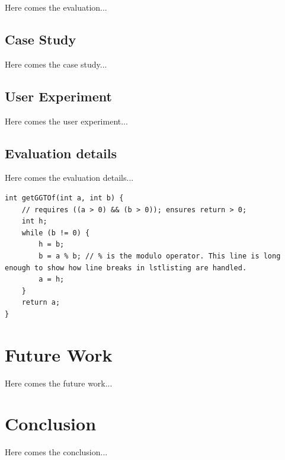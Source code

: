 \documentclass[
    fontsize=12pt,
    headings=small,
    parskip=half,           %
    bibliography=totoc,
    numbers=noenddot,       %
    open=any,               %
    ]{scrreprt}
\begin{document}
Here comes the evaluation...

\section{Case Study}

Here comes the case study...

\section{User Experiment}

Here comes the user experiment...

\section{Evaluation details}

Here comes the evaluation details...

\begin{lstlisting}[float,caption={Example of algorithm},label={lst:ggt}]
int getGGTOf(int a, int b) {
    // requires ((a > 0) && (b > 0)); ensures return > 0;
    int h;
    while (b != 0) {
        h = b;
        b = a % b; // % is the modulo operator. This line is long enough to show how line breaks in lstlisting are handled.
        a = h;
    }
    return a;
}
\end{lstlisting}


\chapter{Future Work}

Here comes the future work...


\chapter{Conclusion}

Here comes the conclusion...


%
%
\newpage


\end{document}
